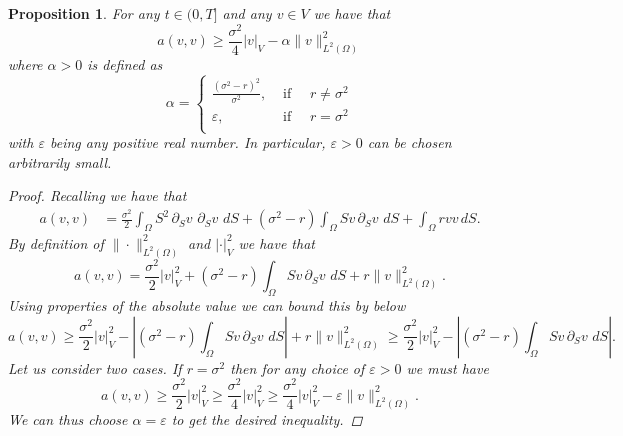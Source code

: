 \documentclass{article}
\newtheorem{prop}[thm]{Proposition}
\newcommand{\intS}[1]{\ensuremath{\int_{\Omega}#1 \, dS}}
\newcommand{\darg}[2]{\ensuremath{\, \partial_{#2}#1} \, }
\newcommand{\dS}[1]{\ensuremath{\darg{#1}{S}}}
\newcommand{\dSv}{\dS{v}}
\newcommand{\sigmafrac}{\ensuremath{\frac{\sigma^2}{2}}}
\newcommand{\seminorm}[1]{\ensuremath{|#1|_V}}
\newcommand{\seminormsq}[1]{\ensuremath{|#1|_V^2}}
\newcommand{\normsq}[1]{\ensuremath{\|#1\|_{L^2(\Omega)}^2}}
\newcommand{\aform}[2]{\ensuremath{\sigmafrac \intS{S^2 \dS{#2} \dS{#1}} + (\sigma^2 - r) \intS{S #2 \dS{#1}} + \intS{r  #1  #2}}}
\begin{document}
\begin{prop}\label{prop:ineq_a}
    For any $t \in (0,T]$ and any $v \in V$ we have that
    \begin{equation*}
        a(v,v) \geq \frac{\sigma^2}{4} \seminorm{v} - \alpha \normsq{v}
    \end{equation*}
    where $\alpha > 0$ is defined as
    \begin{equation*}
        \alpha = \begin{cases}
            \frac{(\sigma^2 - r)^2}{ \sigma^2}, &\text{ if } \quad r \neq \sigma^2\\
            \varepsilon, &\text{ if } \quad r = \sigma^2\\
        \end{cases}
    \end{equation*}
    with $\varepsilon$ being any positive real number. In particular, $\varepsilon >0$ can be chosen arbitrarily small.
    \begin{proof}
        Recalling  we have that
        \begin{align*}
            a(v,v) &= \aform{v}{v}.
        \end{align*}
        By definition of $\normsq{\cdot}$ and $\seminormsq{\cdot}$ we have that
        \begin{equation*}
            a(v,v) = \sigmafrac \seminormsq{v} + (\sigma^2 - r) \intS{S v \dSv} + r \normsq{v}.
        \end{equation*}
        Using properties of the absolute value we can bound this by below
        \begin{equation}\label{eq:first_lower_bound_a}
            a(v,v) \geq \sigmafrac \seminormsq{v} - \left| (\sigma^2 - r) \intS{S v \dSv}\right| + r \normsq{v} \geq \sigmafrac \seminormsq{v} - \left| (\sigma^2 - r) \intS{S v \dSv}\right|.
        \end{equation}
        Let us consider two cases. If $r = \sigma^2$ then for any choice of $\varepsilon >0$ we must have
        \begin{equation}
            a(v,v)  \geq \sigmafrac \seminormsq{v} \geq \frac{\sigma^2}{4} \seminormsq{v} \geq \frac{\sigma^2}{4} \seminormsq{v} - \varepsilon \normsq{v}.
        \end{equation}
        We can thus choose $\alpha = \varepsilon$ to get the desired inequality.


\end{proof}
\end{prop}
\end{document}
